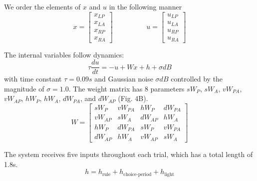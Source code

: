 \documentclass[11pt]{article}
\begin{document}
We order the elements of $x$ and $u$ in the following manner
\begin{equation}
x = \begin{bmatrix} x_{LP} \\ x_{LA} \\ x_{RP} \\ x_{RA} \end{bmatrix} \hspace{2cm} u = \begin{bmatrix} u_{LP} \\ u_{LA} \\ u_{RP} \\ u_{RA} \end{bmatrix}
\end{equation}

 The internal variables follow dynamics:
\begin{equation}
\tau \frac{du}{dt} = -u + Wx + h + \sigma dB
\end{equation}
with time constant $\tau = 0.09s$ and Gaussian noise $\sigma dB$ controlled by the magnitude of $\sigma=1.0$.  The weight matrix has 8 parameters $sW_P$, $sW_A$, $vW_{PA}$, $vW_{AP}$, $hW_P$, $hW_A$, $dW_{PA}$, and $dW_{AP}$ (Fig. 4B).
\begin{equation}
W = \begin{bmatrix} sW_P & vW_{PA} & hW_P & dW_{PA}  \\ vW_{AP}  & sW_A & dW_{AP}  & hW_A \\ hW_P & dW_{PA}  & sW_P & vW_{PA}  \\ dW_{AP}  & hW_A & vW_{AP}  & sW_A \end{bmatrix}
\end{equation}

The system receives five inputs throughout each trial, which has a total length of 1.8s.
\begin{equation}
h = h_{\text{rule}} + h_{\text{choice-period}} + h_{\text{light}}
\end{equation}
\end{document}
